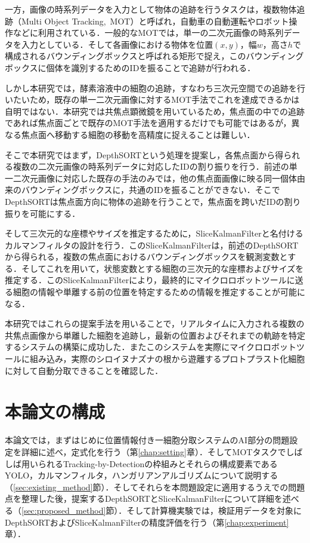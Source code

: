 一方，画像の時系列データを入力として物体の追跡を行うタスクは，複数物体追跡（Multi Object Tracking,\ MOT）と呼ばれ，自動車の自動運転やロボット操作などに利用されている．一般的なMOTでは，単一の二次元画像の時系列データを入力としている．そして各画像における物体を位置$(x, y)$，幅$w$，高さ$h$で構成されるバウンディングボックスと呼ばれる矩形で捉え，このバウンディングボックスに個体を識別するためのIDを振ることで追跡が行われる．

しかし本研究では，酵素溶液中の細胞の追跡，すなわち三次元空間での追跡を行いたいため，既存の単一二次元画像に対するMOT手法でこれを達成できるかは自明ではない．本研究では共焦点顕微鏡を用いているため，焦点面の中での追跡であれば焦点面ごとで既存のMOT手法を適用するだけでも可能ではあるが，異なる焦点面へ移動する細胞の移動を高精度に捉えることは難しい．

そこで本研究ではまず，DepthSORTという処理を提案し，各焦点面から得られる複数の二次元画像の時系列データに対応したIDの割り振りを行う．前述の単一二次元画像に対応した既存の手法のみでは，他の焦点面画像に映る同一個体由来のバウンディングボックスに，共通のIDを振ることができない．そこでDepthSORTは焦点面方向に物体の追跡を行うことで，焦点面を跨いだIDの割り振りを可能にする．

そして三次元的な座標やサイズを推定するために，SliceKalmanFilterと名付けるカルマンフィルタの設計を行う．このSliceKalmanFilterは，前述のDepthSORTから得られる，複数の焦点面におけるバウンディングボックスを観測変数とする．そしてこれを用いて，状態変数とする細胞の三次元的な座標およびサイズを推定する．このSliceKalmanFilterにより，最終的にマイクロロボットツールに送る細胞の情報や単離する前の位置を特定するための情報を推定することが可能になる．

本研究ではこれらの提案手法を用いることで，リアルタイムに入力される複数の共焦点画像から単離した細胞を追跡し，最新の位置およびそれまでの軌跡を特定するシステムの構築に成功した．またこのシステムを実際にマイクロロボットツールに組み込み，実際のシロイヌナズナの根から遊離するプロトプラスト化細胞に対して自動分取できることを確認した．

\section{本論文の構成}
\label{sec:outline}

本論文では，まずはじめに位置情報付き一細胞分取システムのAI部分の問題設定を詳細に述べ，定式化を行う（第\ref{chap:setting}章）．そしてMOTタスクでしばしば用いられるTracking-by-Detectionの枠組みとそれらの構成要素であるYOLO，カルマンフィルタ，ハンガリアンアルゴリズムについて説明する（\ref{sec:existing_method}節）．そしてそれらを本問題設定に適用するうえでの問題点を整理した後，提案するDepthSORTとSliceKalmanFilterについて詳細を述べる（\ref{sec:proposed_method}節）．そして計算機実験では，検証用データを対象にDepthSORTおよびSliceKalmanFilterの精度評価を行う（第\ref{chap:experiment}章）．